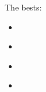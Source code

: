\documentclass[a4paper,10pt]{article}
\begin{document}
The bests:
\begin{itemize}
    \item \cite{bertolinisusy}
    \item \cite{DbranespartI,DbranespartII}
    \item \cite{he2004lectures}
    \item \cite{torigeomandCY}
\end{itemize}

\pagebreak

\listofmarker
{}

\pagebreak

\printbibliography
\end{document}
